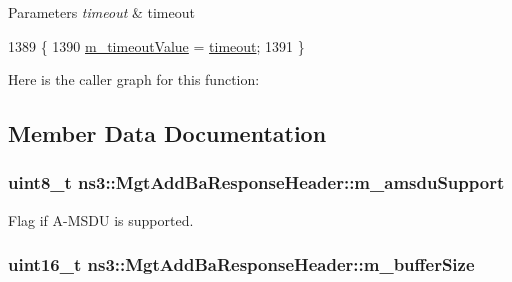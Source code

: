 \begin{DoxyParams}{Parameters}
{\em timeout} & timeout \\
\hline
\end{DoxyParams}

\begin{DoxyCode}
1389 \{
1390   \hyperlink{classns3_1_1MgtAddBaResponseHeader_a80cf49d04f1ba5fd1f892319ec23c6de}{m\_timeoutValue} = \hyperlink{openflow-switch_8cc_a386d174ae121d1cfa279074b7e209714}{timeout};
1391 \}
\end{DoxyCode}


Here is the caller graph for this function\+:




\subsection{Member Data Documentation}
\subsubsection[{\texorpdfstring{m\+\_\+amsdu\+Support}{m_amsduSupport}}]{\setlength{\rightskip}{0pt plus 5cm}uint8\+\_\+t ns3\+::\+Mgt\+Add\+Ba\+Response\+Header\+::m\+\_\+amsdu\+Support\hspace{0.3cm}{\ttfamily [private]}}\hypertarget{classns3_1_1MgtAddBaResponseHeader_a11f64936fd91d6ff3ca697f3369ae371}{}\label{classns3_1_1MgtAddBaResponseHeader_a11f64936fd91d6ff3ca697f3369ae371}


Flag if A-\/\+M\+S\+DU is supported. 

\subsubsection[{\texorpdfstring{m\+\_\+buffer\+Size}{m_bufferSize}}]{\setlength{\rightskip}{0pt plus 5cm}uint16\+\_\+t ns3\+::\+Mgt\+Add\+Ba\+Response\+Header\+::m\+\_\+buffer\+Size\hspace{0.3cm}{\ttfamily [private]}}\hypertarget{classns3_1_1MgtAddBaResponseHeader_a096db2e879b1b2ea1b4965fdbdeb74ec}{}\label{classns3_1_1MgtAddBaResponseHeader_a096db2e879b1b2ea1b4965fdbdeb74ec}


